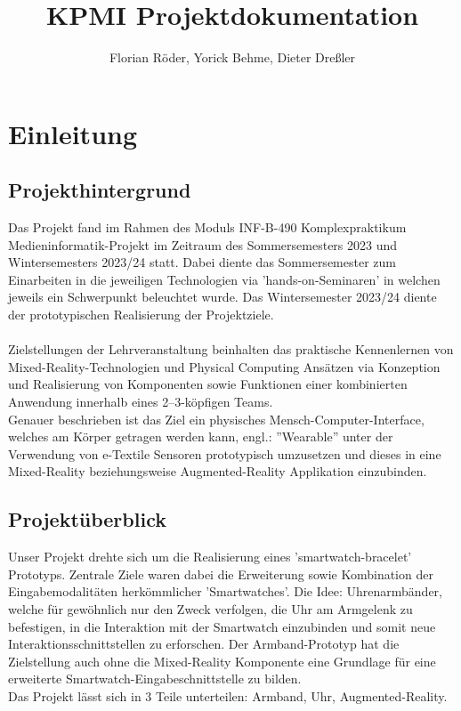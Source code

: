 \documentclass[11pt, a4paper]{article}
\begin{document}
\author{Florian Röder, Yorick Behme, Dieter Dreßler}
\title{KPMI Projektdokumentation}
\maketitle
\setcounter{tocdepth}{4}
\setcounter{secnumdepth}{4}
\tableofcontents

\newpage

\section{Einleitung}

\subsection{Projekthintergrund}

Das Projekt fand im Rahmen des Moduls INF-B-490 Komplexpraktikum Medieninformatik-Projekt im Zeitraum des Sommersemesters 2023 und Wintersemesters 2023/24 statt. 
Dabei diente das Sommersemester zum Einarbeiten in die jeweiligen Technologien via 'hands-on-Seminaren' in welchen jeweils ein Schwerpunkt beleuchtet wurde. 
Das Wintersemester 2023/24 diente der prototypischen Realisierung der Projektziele.\\
\\
Zielstellungen der Lehrveranstaltung beinhalten das praktische Kennenlernen von Mixed-Reality-Technologien und Physical Computing Ansätzen via Konzeption und Realisierung von Komponenten sowie Funktionen einer kombinierten Anwendung innerhalb eines 2–3-köpfigen Teams.\\
Genauer beschrieben ist das Ziel ein physisches Mensch-Computer-Interface, welches am Körper getragen werden kann, engl.: ''Wearable'' unter der Verwendung von e-Textile Sensoren prototypisch umzusetzen und dieses in eine Mixed-Reality beziehungsweise Augmented-Reality Applikation einzubinden.

\subsection{Projektüberblick}

Unser Projekt drehte sich um die Realisierung eines 'smartwatch-bracelet' Prototyps. 
Zentrale Ziele waren dabei die Erweiterung sowie Kombination der Eingabemodalitäten herkömmlicher 'Smartwatches'. 
Die Idee: Uhrenarmbänder, welche für gewöhnlich nur den Zweck verfolgen, die Uhr am Armgelenk zu befestigen, in die Interaktion mit der Smartwatch einzubinden und somit neue Interaktionsschnittstellen zu erforschen. 
Der Armband-Prototyp hat die Zielstellung auch ohne die Mixed-Reality Komponente eine Grundlage für eine erweiterte Smartwatch-Eingabeschnittstelle zu bilden.\\
Das Projekt lässt sich in 3 Teile unterteilen: Armband, Uhr, Augmented-Reality.
\end{document}
